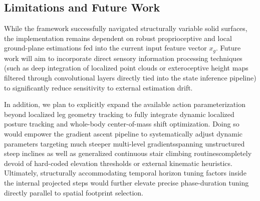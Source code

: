 \subsection{Limitations and Future Work}
While the framework successfully navigated structurally variable solid surfaces, the implementation remains dependent on robust proprioceptive and local ground-plane estimations fed into the current input feature vector $x_g$. Future work will aim to incorporate direct sensory information processing techniques (such as deep integration of localized point clouds or exteroceptive height maps filtered through convolutional layers directly tied into the state inference pipeline) to significantly reduce sensitivity to external estimation drift.

In addition, we plan to explicitly expand the available action parameterization beyond localized leg geometry tracking to fully integrate dynamic localized posture tracking and whole-body center-of-mass shift optimization. Doing so would empower the gradient ascent pipeline to systematically adjust dynamic parameters targeting much steeper multi-level gradients\textemdash spanning unstructured steep inclines as well as generalized continuous stair climbing routines\textemdash completely devoid of hard-coded elevation thresholds or external kinematic heuristics. Ultimately, structurally accommodating temporal horizon tuning factors inside the internal projected steps would further elevate precise phase-duration tuning directly parallel to spatial footprint selection.
